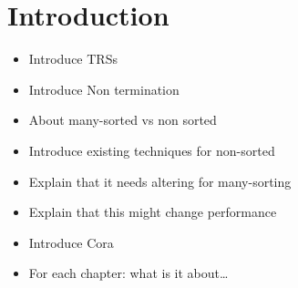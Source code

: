 \chapter{Introduction}\label{introduction}
\begin{itemize}
    \item Introduce TRSs
    \item Introduce Non termination
    \item About many-sorted vs non sorted 
    \item Introduce existing techniques for non-sorted
    \item Explain that it needs altering for many-sorting
    \item Explain that this might change performance
    \item Introduce Cora
    \item For each chapter: what is it about\dots
\end{itemize}
